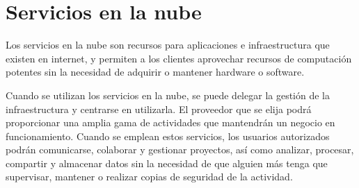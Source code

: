 \section{Servicios en la nube}
Los servicios en la nube son recursos para aplicaciones e infraestructura que existen en internet, y permiten a los clientes aprovechar recursos de computación potentes sin la necesidad de adquirir o mantener hardware o software.

Cuando se utilizan los servicios en la nube, se puede delegar la gestión de la infraestructura y centrarse en utilizarla. El proveedor que se elija podrá proporcionar una amplia gama de actividades que mantendrán un negocio en funcionamiento. Cuando se emplean estos servicios, los usuarios autorizados podrán comunicarse, colaborar y gestionar proyectos, así como analizar, procesar, compartir y almacenar datos sin la necesidad de que alguien más tenga que supervisar, mantener o realizar copias de seguridad de la actividad.
    
    
    